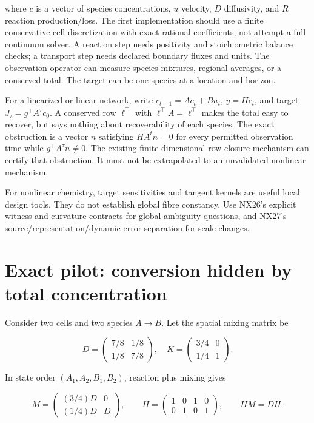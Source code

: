\documentclass[
  11pt,
  a4paper,
]{report}
\begin{document}
where \(c\) is a vector of species concentrations, \(u\) velocity, \(D\)
diffusivity, and \(R\) reaction production/loss. The first
implementation should use a finite conservative cell discretization with
exact rational coefficients, not attempt a full continuum solver. A
reaction step needs positivity and stoichiometric balance checks; a
transport step needs declared boundary fluxes and units. The observation
operator can measure species mixtures, regional averages, or a conserved
total. The target can be one species at a location and horizon.

For a linearized or linear network, write \(c_{t+1}=Ac_t+Bu_t\),
\(y=Hc_t\), and target \(J_\tau=g^\top A^\tau c_0\). A conserved row
\(\ell^\top\) with \(\ell^\top A=\ell^\top\) makes the total easy to
recover, but says nothing about recoverability of each species. The
exact obstruction is a vector \(n\) satisfying \(HA^tn=0\) for every
permitted observation time while \(g^\top A^\tau n\ne0\). The existing
finite-dimensional row-closure mechanism can certify that obstruction.
It must not be extrapolated to an unvalidated nonlinear mechanism.

For nonlinear chemistry, target sensitivities and tangent kernels are
useful local design tools. They do not establish global fibre constancy.
Use NX26's explicit witness and curvature contracts for global ambiguity
questions, and NX27's source/representation/dynamic-error separation for
scale changes.

\hypertarget{exact-pilot-conversion-hidden-by-total-concentration}{%
\section{Exact pilot: conversion hidden by total
concentration}\label{exact-pilot-conversion-hidden-by-total-concentration}}

Consider two cells and two species \(A\to B\). Let the spatial mixing
matrix be

\[
 D=\begin{pmatrix}7/8&1/8\\1/8&7/8\end{pmatrix},
\quad
 K=\begin{pmatrix}3/4&0\\1/4&1\end{pmatrix}.
\]

In state order \((A_1,A_2,B_1,B_2)\), reaction plus mixing gives

\[
 M=\begin{pmatrix}(3/4)D&0\\(1/4)D&D\end{pmatrix},
 \qquad H=\begin{pmatrix}1&0&1&0\\0&1&0&1\end{pmatrix},
 \qquad HM=DH.
\]
\end{document}
